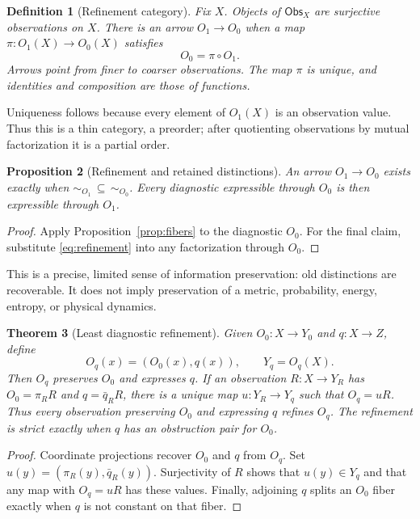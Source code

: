 \documentclass[11pt,letterpaper]{article}
\newtheorem{theorem}{Theorem}[section]
\newtheorem{proposition}[theorem]{Proposition}
\newtheorem{definition}[theorem]{Definition}
\begin{document}
\begin{definition}[Refinement category]
Fix $X$. Objects of $\mathsf{Obs}_X$ are surjective observations on $X$.
There is an arrow $O_1\to O_0$ when a map $\pi:O_1(X)\to O_0(X)$ satisfies
\begin{equation}\label{eq:refinement}
O_0=\pi\circ O_1.
\end{equation}
Arrows point from finer to coarser observations. The map $\pi$ is unique,
and identities and composition are those of functions.
\end{definition}
Uniqueness follows because every element of $O_1(X)$ is an observation value.
Thus this is a thin category, a preorder; after quotienting observations by
mutual factorization it is a partial order.

\begin{proposition}[Refinement and retained distinctions]\label{prop:refineobs}
An arrow $O_1\to O_0$ exists exactly when
$\sim_{O_1}\,\subseteq\,\sim_{O_0}$. Every diagnostic expressible through $O_0$
is then expressible through $O_1$.
\end{proposition}
\begin{proof}
Apply Proposition~\ref{prop:fibers} to the diagnostic $O_0$. For the final
claim, substitute \eqref{eq:refinement} into any factorization through $O_0$.
\end{proof}
This is a precise, limited sense of information preservation: old distinctions
are recoverable. It does not imply preservation of a metric, probability,
energy, entropy, or physical dynamics.

\begin{theorem}[Least diagnostic refinement]\label{thm:augmentation}
Given $O_0:X\to Y_0$ and $q:X\to Z$, define
\[
O_q(x)=(O_0(x),q(x)),\qquad Y_q=O_q(X).
\]
Then $O_q$ preserves $O_0$ and expresses $q$. If an observation $R:X\to Y_R$
has $O_0=\pi_R R$ and $q=\bar q_R R$, there is a unique map
$u:Y_R\to Y_q$ such that $O_q=uR$. Thus every observation preserving $O_0$
and expressing $q$ refines $O_q$. The refinement is strict exactly when
$q$ has an obstruction pair for $O_0$.
\end{theorem}
\begin{proof}
Coordinate projections recover $O_0$ and $q$ from $O_q$.
Set $u(y)=(\pi_R(y),\bar q_R(y))$. Surjectivity of $R$ shows that
$u(y)\in Y_q$ and that any map with $O_q=uR$ has these values.
Finally, adjoining $q$ splits an $O_0$ fiber exactly when $q$ is not
constant on that fiber.
\end{proof}
\end{document}

